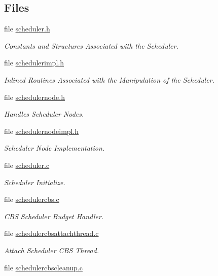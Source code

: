 \subsection*{Files}
\begin{DoxyCompactItemize}
\item 
file \mbox{\hyperlink{score_2scheduler_8h}{scheduler.\+h}}
\begin{DoxyCompactList}\small\item\em Constants and Structures Associated with the Scheduler. \end{DoxyCompactList}\item 
file \mbox{\hyperlink{schedulerimpl_8h}{schedulerimpl.\+h}}
\begin{DoxyCompactList}\small\item\em Inlined Routines Associated with the Manipulation of the Scheduler. \end{DoxyCompactList}\item 
file \mbox{\hyperlink{schedulernode_8h}{schedulernode.\+h}}
\begin{DoxyCompactList}\small\item\em Handles Scheduler Nodes. \end{DoxyCompactList}\item 
file \mbox{\hyperlink{schedulernodeimpl_8h}{schedulernodeimpl.\+h}}
\begin{DoxyCompactList}\small\item\em Scheduler Node Implementation. \end{DoxyCompactList}\item 
file \mbox{\hyperlink{scheduler_8c}{scheduler.\+c}}
\begin{DoxyCompactList}\small\item\em Scheduler Initialize. \end{DoxyCompactList}\item 
file \mbox{\hyperlink{schedulercbs_8c}{schedulercbs.\+c}}
\begin{DoxyCompactList}\small\item\em C\+BS Scheduler Budget Handler. \end{DoxyCompactList}\item 
file \mbox{\hyperlink{schedulercbsattachthread_8c}{schedulercbsattachthread.\+c}}
\begin{DoxyCompactList}\small\item\em Attach Scheduler C\+BS Thread. \end{DoxyCompactList}\item 
file \mbox{\hyperlink{schedulercbscleanup_8c}{schedulercbscleanup.\+c}}

\end{DoxyCompactItemize}
